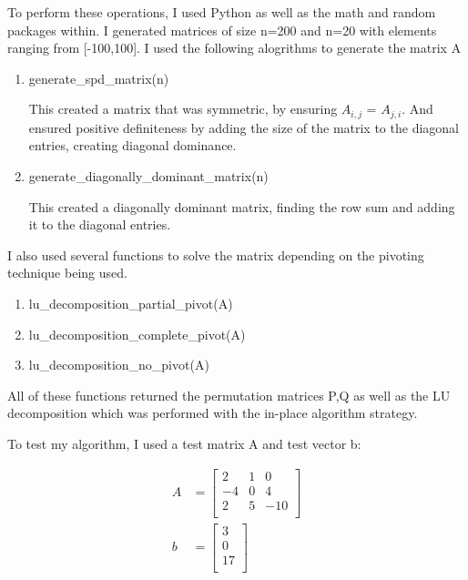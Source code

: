 \documentclass[12pt, letterpaper]{article}
\begin{document}
To perform these operations, I used Python as well as the math and random packages within. I generated matrices of size n=200 and n=20 with elements ranging from [-100,100]. I used the following alogrithms to generate the matrix A
\begin{enumerate}
   \item generate\_spd\_matrix(n)
   
         This created a matrix that was symmetric, by ensuring $A_{i,j}$ = $A_{j,i}$. And ensured positive definiteness by adding the size of the matrix to the diagonal entries, creating diagonal dominance.

   \item generate\_diagonally\_dominant\_matrix(n)
   
         This created a diagonally dominant matrix, finding the row sum and adding it to the diagonal entries.

\end{enumerate}

I also used several functions to solve the matrix depending on the pivoting technique being used.

\begin{enumerate}
   \item lu\_decomposition\_partial\_pivot(A)
   \item lu\_decomposition\_complete\_pivot(A)
   \item lu\_decomposition\_no\_pivot(A)
\end{enumerate}

All of these functions returned the permutation matrices P,Q as well as the LU decomposition which was performed with the in-place algorithm strategy.

To test my algorithm, I used a test matrix A and test vector b:

\begin{align*}
   A &= \begin{bmatrix}
   2 & 1 & 0 \\
   -4 & 0 & 4 \\
   2 & 5 & -10 \\
   \end{bmatrix}
   \\
   b &= \begin{bmatrix}
   3 \\
   0 \\
   17 \\
   \end{bmatrix}
\end{align*}
\end{document}
